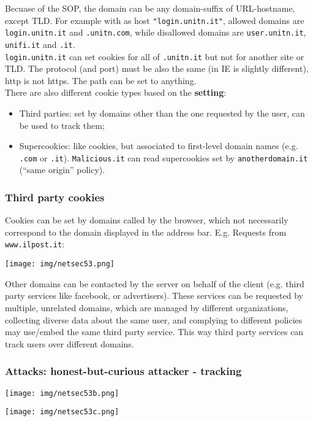 \documentclass[a4paper, 10pt, titlepage]{article}
\begin{document}
Becuase of the SOP, the domain can be any domain-suffix of URL-hostname, except TLD. For example with as host \lstinline|"login.unitn.it"|, allowed domains are \lstinline|login.unitn.it| and \lstinline|.unitn.com|, while disallowed domains are 	\lstinline|user.unitn.it|, \lstinline|unifi.it| and \lstinline|.it|. \\
\lstinline|login.unitn.it| can set cookies for all of \lstinline|.unitn.it| but not for another site or TLD. The protocol (and port) must be also the same (in IE is slightly different), http is not https. The path can be set to anything. \medskip\\
There are also different cookie types based on the \textbf{setting}:
\begin{itemize}
	\item Third parties: set by domains other than the one requested by the user, can be used to track them;
	\item Supercookies: like cookies, but associated to first-level domain names (e.g. \lstinline|.com| or \lstinline|.it|). \lstinline|Malicious.it| can read supercookies set by \lstinline|anotherdomain.it| (“same origin” policy).
\end{itemize}

\subsubsection*{Third party cookies}
Cookies can be set by domains called by the browser, which not necessarily correspond to the domain displayed in the address bar. E.g. Requests from \lstinline|www.ilpost.it|:
\begin{center}
	\texttt{[image: img/netsec53.png]}
\end{center}
Other domains can be contacted by the server on behalf of the client (e.g. third party services like facebook, or advertisers). These services can be requested by multiple, unrelated domains, which are managed by different organizations, collecting diverse data about the same user, and complying to different policies may use/embed the same third party service. This way third party services can track users over different domains.

\subsubsection{Attacks: honest-but-curious attacker - tracking}
\begin{center}
	\texttt{[image: img/netsec53b.png]}
\end{center}
\begin{center}
	\texttt{[image: img/netsec53c.png]}
\end{center}
\end{document}
